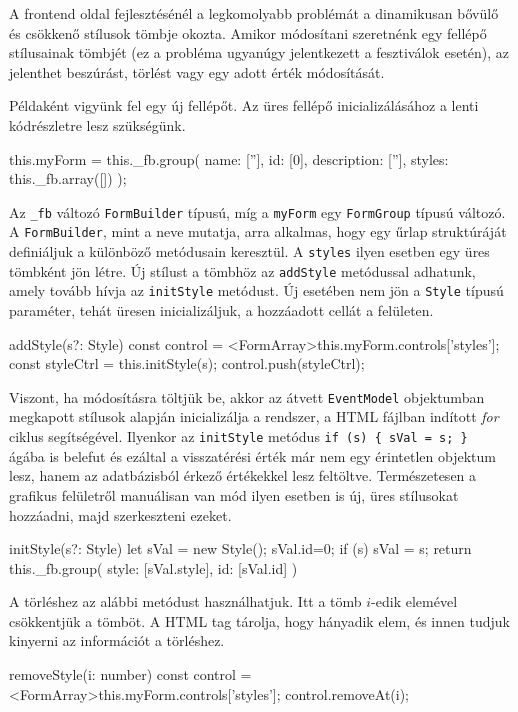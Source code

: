 
A frontend oldal fejlesztésénél a legkomolyabb problémát a dinamikusan bővülő és csökkenő stílusok tömbje okozta. Amikor módosítani szeretnénk egy fellépő stílusainak tömbjét (ez a probléma ugyanúgy jelentkezett a fesztiválok esetén), 
az jelenthet beszúrást, törlést vagy egy adott érték módosítását.

Példaként vigyünk fel egy új fellépőt. Az üres fellépő inicializálásához a lenti kódrészletre lesz szükségünk.
\begin{java}
this.myForm = this._fb.group({
    name: [''],
    id: [0],
    description: [''],
    styles: this._fb.array([])
});
\end{java}
Az \texttt{\_fb} változó \texttt{FormBuilder} típusú, míg a \texttt{myForm} egy \texttt{FormGroup} típusú változó. A \texttt{FormBuilder}, mint a neve mutatja, arra alkalmas, hogy egy űrlap struktúráját definiáljuk a különböző metódusain keresztül. A \texttt{styles} ilyen esetben egy üres tömbként jön létre. Új stílust a tömbhöz az \texttt{addStyle} metódussal adhatunk, amely tovább hívja az \texttt{initStyle} metódust. Új esetében nem jön a \texttt{Style} típusú paraméter, tehát üresen inicializáljuk, a hozzáadott cellát a felületen.
\begin{java}
addStyle(s?: Style) {
    const control = <FormArray>this.myForm.controls['styles'];
    const styleCtrl = this.initStyle(s);
    control.push(styleCtrl);
}
\end{java}
Viszont, ha módosításra töltjük be, akkor az átvett \texttt{EventModel} objektumban megkapott stílusok alapján inicializálja a rendszer, a HTML fájlban indított \textit{for} ciklus segítségével. Ilyenkor az \texttt{initStyle} metódus \texttt{if (s) \{ sVal = s; \} } ágába is belefut és ezáltal a visszatérési érték már nem egy érintetlen objektum lesz, hanem az adatbázisból érkező értékekkel lesz feltöltve. Természetesen a grafikus felületről manuálisan van mód ilyen esetben is új, üres stílusokat hozzáadni, majd szerkeszteni ezeket. 
\begin{java}
initStyle(s?: Style) {
    let sVal = new Style();
    sVal.id=0;
    if (s) { sVal = s; }
    return this._fb.group({
        style: [sVal.style],
        id: [sVal.id]
    })
}
\end{java}
A törléshez az alábbi metódust használhatjuk. Itt a tömb $i$-edik elemével csökkentjük a tömböt. A HTML tag tárolja, hogy hányadik elem, és innen tudjuk kinyerni az információt a törléshez.
\begin{java}
removeStyle(i: number) {
    const control = <FormArray>this.myForm.controls['styles'];
    control.removeAt(i);
}
\end{java}
